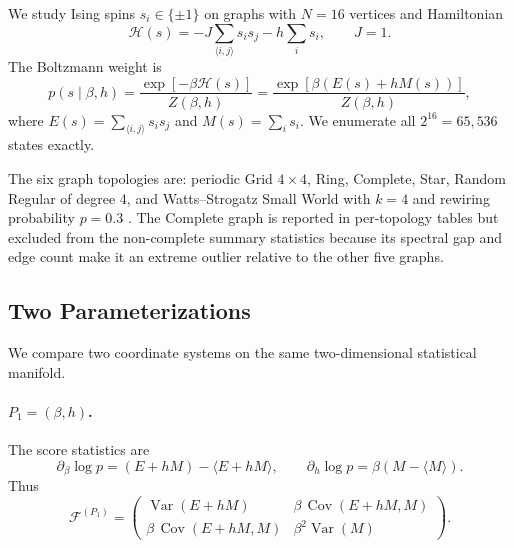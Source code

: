 \documentclass[11pt,a4paper]{article}
\begin{document}
We study Ising spins $s_i\in\{\pm1\}$ on graphs with $N=16$ vertices and Hamiltonian
\begin{equation}
\mathcal H(s)=-J\sum_{\langle i,j\rangle}s_i s_j-h\sum_i s_i,
\qquad J=1.
\end{equation}
The Boltzmann weight is
\begin{equation}
p(s\mid\beta,h)=\frac{\exp[-\beta\mathcal H(s)]}{Z(\beta,h)}
=\frac{\exp[\beta(E(s)+hM(s))]}{Z(\beta,h)},
\end{equation}
where $E(s)=\sum_{\langle i,j\rangle}s_i s_j$ and $M(s)=\sum_i s_i$.  We enumerate all $2^{16}=65{,}536$ states exactly.

The six graph topologies are: periodic Grid $4\times4$, Ring, Complete, Star, Random Regular of degree 4, and Watts--Strogatz Small World with $k=4$ and rewiring probability $p=0.3$ \citep{watts1998collective}.  The Complete graph is reported in per-topology tables but excluded from the non-complete summary statistics because its spectral gap and edge count make it an extreme outlier relative to the other five graphs.

\subsection{Two Parameterizations}

We compare two coordinate systems on the same two-dimensional statistical manifold.

\paragraph{$P_1=(\beta,h)$.}
The score statistics are
\begin{equation}
\partial_\beta\log p=(E+hM)-\langle E+hM\rangle,\qquad
\partial_h\log p=\beta(M-\langle M\rangle).
\end{equation}
Thus
\begin{equation}
\mathcal F^{(P_1)}
=\begin{pmatrix}
\operatorname{Var}(E+hM) & \beta\,\operatorname{Cov}(E+hM,M)\\
\beta\,\operatorname{Cov}(E+hM,M) & \beta^2\operatorname{Var}(M)
\end{pmatrix}.
\end{equation}
\end{document}
